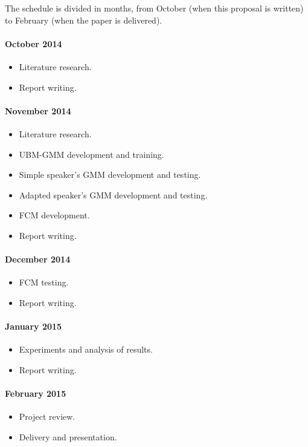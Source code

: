 \documentclass[a4paper,twocolumn]{article}
\begin{document}
The schedule is divided in months, from October (when this proposal is written) to February (when the paper is delivered).

\paragraph{\textbf{October 2014}}
\begin{itemize}[noitemsep]
    \item Literature research.
    \item Report writing.
\end{itemize}

\paragraph{\textbf{November 2014}}
\begin{itemize}[noitemsep]
    \item Literature research.
    \item UBM-GMM development and training.
    \item Simple speaker's GMM development and testing.
    \item Adapted speaker's GMM development and testing.
    \item FCM development.
    \item Report writing.
\end{itemize}

\paragraph{\textbf{December 2014}}
\begin{itemize}[noitemsep]
    \item FCM testing.
    \item Report writing.
\end{itemize}

\paragraph{\textbf{January 2015}}
\begin{itemize}[noitemsep]
    \item Experiments and analysis of results.
    \item Report writing.
\end{itemize}

\paragraph{\textbf{February 2015}}
\begin{itemize}[noitemsep]
    \item Project review.
    \item Delivery and presentation.
\end{itemize}
\end{document}
